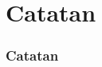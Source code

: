 \documentclass[table,dvipsnames]{beamer}
\begin{document}
% 
% 
% 
% 

% 
% 

\section{Catatan}

\begin{frame}
\frametitle{Catatan}
\end{frame}
\end{document}
